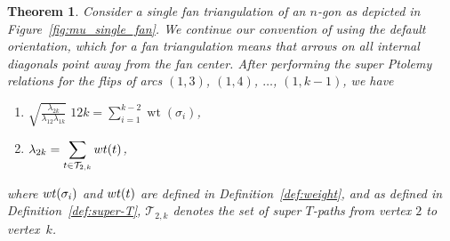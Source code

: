 \documentclass[11pt]{article}
\numberwithin{equation}{section}
\numberwithin{equation}{section}
\newtheorem{Theorem}{Theorem}[section]
\DeclareMathOperator{\wt}{wt}
\renewcommand{\l}[2]{\lambda_{#1#2}}
\begin{document}
\begin{Theorem} \label{thm:mu_single_fan}
 Consider a single fan triangulation of an $n$-gon as depicted in Figure~{\rm \ref{fig:mu_single_fan}}. We continue our convention of using the default orientation,
 which for a fan triangulation means that arrows on all internal diagonals point away from the fan center.
 After performing the super Ptolemy relations for the flips of arcs $(1,3)$, $(1,4)$, $\dots$, $(1,k-1)$, we have
 \begin{enumerate}\itemsep=0pt
 \item[$(a)$] $\displaystyle \sqrt{\frac{\l2k}{\l12\l1k}} \; \boxed{12k} = \sum_{i=1}^{k-2}\wt(\sigma_i)$,
 \item[$(b)$] $\displaystyle \lambda_{2k} = \sum_{t \in \mathcal{T}_{2,k}} {\rm wt}(t)$,
 \end{enumerate}
 where ${\rm wt}(\sigma_i)$ and ${\rm wt}(t)$ are defined in Definition~{\rm \ref{def:weight}}, and as defined in Definition~{\rm \ref{def:super-T}}, $\mathcal{T}_{2,k}$ denotes the set of super $T$-paths from vertex $2$ to vertex~$k$.
\end{Theorem}
\end{document}
